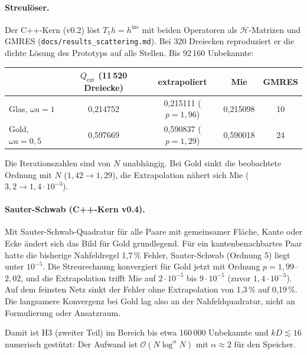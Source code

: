 \documentclass[11pt, a4paper]{article}
\begin{document}
\paragraph{Streulöser.} Der C++-Kern (v0.2) löst $T_1h=h^{\mathrm{inc}}$ mit beiden Operatoren als
$\mathcal{H}$-Matrizen und GMRES (\texttt{docs/results\_scattering.md}). Bei 320 Dreiecken
reproduziert er die dichte Lösung des Prototyps auf alle Stellen. Bis 92\,160 Unbekannte:
\begin{center}\small
\begin{tabular}{lcccc}
\toprule
& $Q_{\mathrm{ext}}$ (11\,520 Dreiecke) & extrapoliert & Mie & GMRES\\
\midrule
Glas, $\omega a=1$ & 0,214752 & 0,215111 ($p=1{,}96$) & 0,215098 & 10\\
Gold, $\omega a=0{,}5$ & 0,597669 & 0,590837 ($p=1{,}29$) & 0,590018 & 24\\
\bottomrule
\end{tabular}
\end{center}
Die Iterationszahlen sind von $N$ unabhängig. Bei Gold sinkt die beobachtete Ordnung mit
$N$ ($1{,}42\to1{,}29$), die Extrapolation nähert sich Mie ($3{,}2\to1{,}4\cdot10^{-3}$).

\paragraph{Sauter-Schwab (C++-Kern v0.4).} Mit Sauter-Schwab-Quadratur für alle Paare mit gemeinsamer
Fläche, Kante oder Ecke ändert sich das Bild für Gold grundlegend. Für ein kantenbenachbartes
Paar hatte die bisherige Nahfeldregel 1,7\,\% Fehler, Sauter-Schwab (Ordnung 5) liegt unter
$10^{-5}$. Die Streurechnung konvergiert für Gold jetzt mit Ordnung $p=1{,}99$--$2{,}02$, und die
Extrapolation trifft Mie auf $2\cdot10^{-5}$ bis $9\cdot10^{-5}$ (zuvor $1{,}4\cdot10^{-3}$). Auf dem
feinsten Netz sinkt der Fehler ohne Extrapolation von 1,3\,\% auf 0,19\,\%. Die langsamere
Konvergenz bei Gold lag also an der Nahfeldquadratur, nicht an Formulierung oder Ansatzraum.

Damit ist H3 (zweiter Teil) im Bereich bis etwa 160\,000 Unbekannte und $kD\lesssim16$ numerisch
gestützt: Der Aufwand ist $\mathcal{O}(N\log^\alpha N)$ mit $\alpha\approx2$ für den Speicher.
\end{document}
